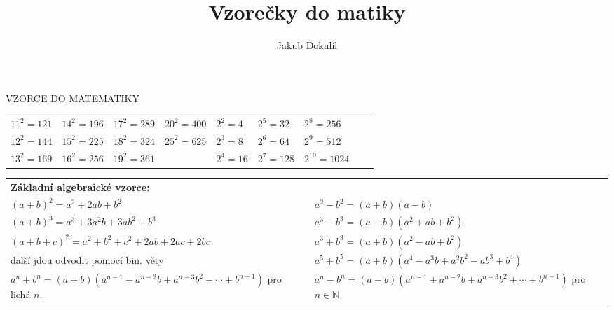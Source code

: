 \documentclass[10pt,a4paper]{article}
\author{Jakub Dokulil}
\title{Vzorečky do matiky}
\newcommand{\nazv}[1]{{\large \textbf{\textsf{#1}}}}
\begin{document}
\begin{center}
\begin{Large}
\textsc{VZORCE DO MATEMATIKY}
\end{Large}
\end{center}
\hspace{4pt}\nazv{Konstanty:}

\begin{tabular}{lllllllll}
$11^2=121$&$14^2=196$&$17^2=289$&$20^2=400$&$2^2=4$&$2^5=32$&$2^8=256$
\\
$12^2=144$&$15^2=225$&$18^2=324$&$25^2=625$&$2^3=8$&$2^6=64$&$2^9=512$
\\
$13^2=169$&$16^2=256$&$19^2=361$&	&$2^4=16$&$2^7=128$&$2^{10}=1024$
%
\end{tabular}


\begin{tabular}{p{9.5cm}p{9.5cm}}
\multicolumn{2}{l}{
\nazv{Základní algebraické vzorce:}}\\
$(a+b)^2=a^2+2ab+b^2$ & $a^2-b^2=(a+b)(a-b)$ \\ 

$(a+b)^3=a^3+3a^2b+3ab^2+b^3$ & $a^3-b^3=(a-b)(a^2+ab+b^2)$ \\ 
$(a+b+c)^2=a^2+b^2+c^2+2ab+2ac+2bc$ &$a^3 + b^3 =(a+b)(a^2-ab+b^2)$   \\další jdou odvodit pomocí bin. věty&$a^5+b^5=(a+b)(a^4-a^3b+a^2b^2-ab^3+b^4)$\\
$a^n+b^n=(a+b)(a^{n-1}-a^{n-2}b+a^{n-3}b^2-\cdots+b^{n-1})$ \newline  
pro lichá $n$.&$a^n-b^n=(a-b)(a^{n-1}+a^{n-2}b+a^{n-3}b^2 +\cdots +b^{n-1})$ \newline pro $n\in\mathbb{N}$ \\
\end{tabular}
 
\end{document}
